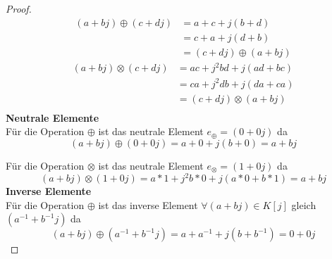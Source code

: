 \documentclass{../problemset}
\begin{document}
\begin{problem}
\begin{proof}
	\begin{align}
		(a + bj) \oplus (c + dj) & = a + c + j(b + d)         \\
		                         & = c + a + j(d + b)         \\
		                         & = (c + dj) \oplus (a + bj)
	\end{align}
	\begin{align}
		(a + bj) \otimes (c + dj) & = ac + j^2bd + j(ad + bc)   \\
		                          & = ca + j^2db + j(da + ca)   \\
		                          & = (c + dj) \otimes (a + bj) \\
	\end{align}
	\textbf{Neutrale Elemente} \\
	Für die Operation $\oplus$ ist das neutrale Element $e_\oplus = (0+0j)$ da \[
		(a + bj) \oplus (0 + 0j)   = a + 0 + j(b + 0) = a + bj
	\]

	Für die Operation $\otimes$ ist das neutrale Element $e_\otimes = (1+0j)$ da \[
		(a + bj) \otimes (1 + 0j)  = a*1 + j^2b*0 + j(a*0 + b*1) = a + bj
	\]
	\textbf{Inverse Elemente} \\
	Für die Operation $\oplus$ ist das inverse Element $\forall (a + bj) \in K[j]$ gleich $(a^{-1}+b^{-1}j)$ da \[
		(a + bj) \oplus (a^{-1} + b^{-1}j) = a + a^{-1} + j(b + b^{-1}) = 0 + 0j
	\]


\end{proof}
\end{problem}
\end{document}
